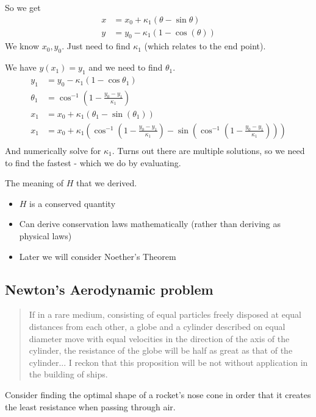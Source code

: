 \documentclass{X:/Documents/Coding/Latex/myassignment}
\begin{document}
So we get
\begin{align*}
	x &= x_0 + \kappa_1 (\theta - \sin\theta)\\
	y &= y_0 - \kappa_1 (1 - \cos(\theta))
\end{align*}
We know $x_0,y_0$. Just need to find $\kappa_1$ (which relates to the end point).

We have $y(x_1) = y_1$ and we need to find $\theta_1$.
\begin{align*}
	y_1 &= y_0 - \kappa_1(1-\cos \theta_1)\\
	\theta_1 &= \cos^{-1}\left(1- \frac{y_0-y_1 }{\kappa_1}\right)\\
	x_1 &= x_0 + \kappa_1(\theta_1 - \sin(\theta_1))\\
	x_1	&= x_0 + \kappa_1(\cos^{-1}\left(1- \frac{y_0-y_1 }{\kappa_1}\right) - \sin(\cos^{-1}\left(1- \frac{y_0-y_1 }{\kappa_1}\right)))\\
\end{align*}
And numerically solve for $\kappa_1$. 
Turns out there are multiple solutions, so we need to find the fastest - which we do by evaluating.


The meaning of $H$ that we derived.
\begin{itemize}
	\item $H$ is a conserved quantity
	\item Can derive conservation laws mathematically (rather than deriving as physical laws)
	\item Later we will consider Noether's Theorem
\end{itemize}

\subsection{Newton's Aerodynamic problem}
\begin{quote}
	If in a rare medium, consisting of equal particles freely disposed at equal distances from each other, a globe and a cylinder described on equal diameter move with equal velocities in the direction of the axis of the cylinder, the resistance of the globe will be half as great as that of the cylinder... I reckon that this proposition will be not without application in the building of ships.
\end{quote}
Consider finding the optimal shape of a rocket's nose cone in order that it creates the least resistance when passing through air.
\end{document}
